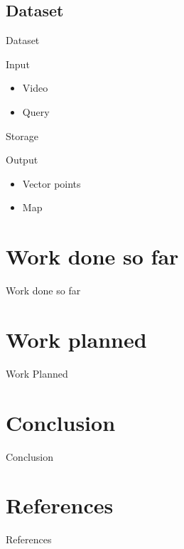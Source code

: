 \documentclass{beamer}
\begin{document}
\subsection{Dataset}
\begin{frame}{Dataset}
	\begin{block}{Input}
		\begin{itemize}
			\item Video
			\item Query
		\end{itemize}
	\end{block}

	\begin{block}{Storage}
	\end{block}

	\begin{block}{Output}
		\begin{itemize}
			\item Vector points
			\item Map
		\end{itemize}
	\end{block}
\end{frame}


\section{Work done so far}
\begin{frame}{Work done so far}
\end{frame}


\section{Work planned}
\begin{frame}{Work Planned}
\end{frame}


\section{Conclusion}
\begin{frame}{Conclusion}
\end{frame}


\section{References}
\begin{frame}{References}
	\nocite{*}
	
	
\end{frame}

\end{document}

